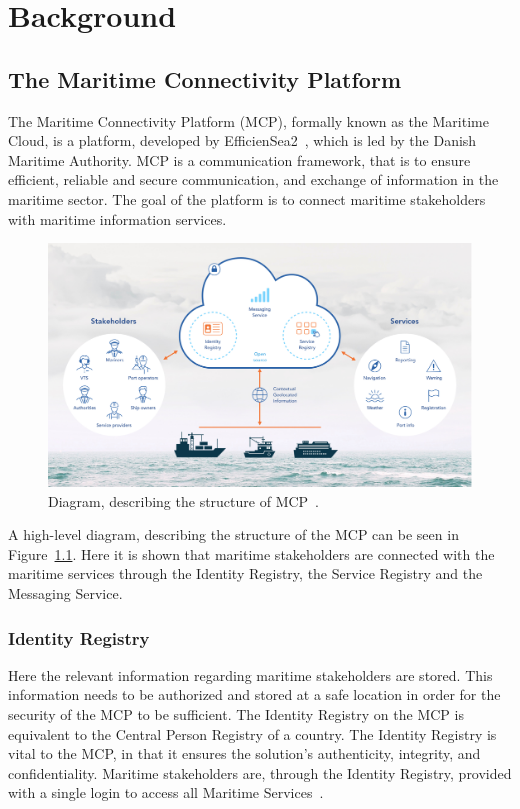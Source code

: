 \chapter{Background}

\section{The Maritime Connectivity Platform}
The Maritime Connectivity Platform (MCP), formally known as the Maritime Cloud, is a platform, developed by EfficienSea2~\cite{efficienSea2}, which is led by the Danish Maritime Authority. 
MCP is a communication framework, that is to ensure efficient, reliable and secure communication, and exchange of information in the maritime sector.
The goal of the platform is to connect maritime stakeholders with maritime information services.
\begin{figure}
  \includegraphics[width=1\textwidth]{figures/MCPStructure}
  \caption{Diagram, describing the structure of MCP~\cite{efficienSea2}.}
  \label{fig:MCPStruct}
\end{figure}\noindent
A high-level diagram, describing the structure of the MCP can be seen in Figure~\ref{fig:MCPStruct}. Here it is shown that maritime stakeholders are connected with the maritime services through the Identity Registry, the Service Registry and the Messaging Service.

\subsection{Identity Registry}
Here the relevant information regarding maritime stakeholders are stored. This information needs to be authorized and stored at a safe location in order for the security of the MCP to be sufficient. The Identity Registry on the MCP is equivalent to the Central Person Registry of a country. The Identity Registry is vital to the MCP, in that it ensures the solution's authenticity, integrity, and confidentiality. Maritime stakeholders are, through the Identity Registry, provided with a single login to access all Maritime Services~\cite{efficienSea2}.
